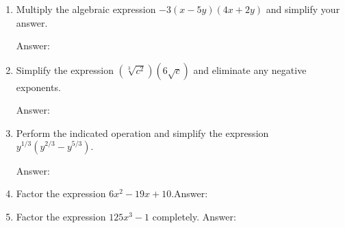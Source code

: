 \documentclass[11pt]{article}
\begin{document}
\begin{enumerate}
\vfill
\newpage


\item Multiply the algebraic expression  $-3(x-5y)(4x+2y)$  and simplify your answer.\\
 \begin{flushright}{Answer: \underline{\hspace{2in}}}\end{flushright}
 
\vfill

\item Simplify the expression $(\sqrt[3]{c^2})(6\sqrt{c})$ and eliminate any negative exponents.\\
\begin{flushright}{Answer: \underline{\hspace{2in}}}\end{flushright}

\vfill


\item Perform the indicated operation and simplify the expression $y^{1/3}(y^{2/3}-y^{5/3}).$\\
\begin{flushright}{Answer: \underline{\hspace{2in}}}\end{flushright}

\vfill

\item Factor the expression $6x^2-19x+10.$\hfill Answer: \underline{\hspace{2in}}\\
\vfill


\item Factor the expression $125x^3-1$ completely. \hfill Answer: \underline{\hspace{2in}}\\
\vfill




\end{enumerate}
\end{document}
